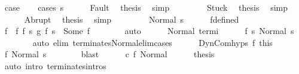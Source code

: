 \begin{isabellebody}
\ {\isacharquery}case\isanewline
\ \ \isamarkupfalse%
\ {\isacharparenleft}cases\ s{\isacharparenright}\isanewline
\ \ \ \ \isamarkupfalse%
\ Fault\ \isamarkupfalse%
\ {\isacharquery}thesis\ \isamarkupfalse%
\ simp\isanewline
\ \ \isamarkupfalse%
\isanewline
\ \ \ \ \isamarkupfalse%
\ Stuck\ \isamarkupfalse%
\ {\isacharquery}thesis\ \isamarkupfalse%
\ simp\isanewline
\ \ \isamarkupfalse%
\isanewline
\ \ \ \ \isamarkupfalse%
\ Abrupt\ \isamarkupfalse%
\ {\isacharquery}thesis\ \isamarkupfalse%
\ simp\isanewline
\ \ \isamarkupfalse%
\isanewline
\ \ \ \ \isamarkupfalse%
\ {\isacharparenleft}Normal\ s{\isacharprime}{\isacharparenright}\isanewline
\ \ \ \ \isamarkupfalse%
\ f{\isacharunderscore}defined\ \isamarkupfalse%
\ f\ \ f{\isacharcolon}\ {\isachardoublequoteopen}{\isacharparenleft}{\isacharparenleft}f{}\ s{\isacharprime}{\isacharparenright}\ {\isasyminter}\isactrlsub g\ {\isacharparenleft}f{}\ s{\isacharprime}{\isacharparenright}{\isacharparenright}\ {\isacharequal}\ Some\ f{\isachardoublequoteclose}\isanewline
\ \ \ \ \ \ \isamarkupfalse%
\ auto\isanewline
\ \ \ \ \isamarkupfalse%
\ Normal\ termi\isanewline
\ \ \ \ \isamarkupfalse%
\ {\isachardoublequoteopen}{\isasymGamma}{\isasymturnstile}f{}\ s{\isacharprime}{\isasymdown}\ {\isacharparenleft}Normal\ s{\isacharprime}{\isacharparenright}{\isachardoublequoteclose}\isanewline
\ \ \ \ \ \ \isamarkupfalse%
\ {\isacharparenleft}auto\ elim{\isacharcolon}\ terminates{\isacharunderscore}Normal{\isacharunderscore}elim{\isacharunderscore}cases{\isacharparenright}\isanewline
\ \ \ \ \isamarkupfalse%
\ DynCom{\isachardot}hyps\ f\ this\ \isanewline
\ \ \ \ \isamarkupfalse%
\ {\isachardoublequoteopen}{\isasymGamma}{\isasymturnstile}f{\isasymdown}\ {\isacharparenleft}Normal\ s{\isacharprime}{\isacharparenright}{\isachardoublequoteclose}\isanewline
\ \ \ \ \ \ \isamarkupfalse%
\ blast\isanewline
\ \ \ \ \isamarkupfalse%
\ c\ f\ Normal\isanewline
\ \ \ \ \isamarkupfalse%
\ {\isacharquery}thesis\isanewline
\ \ \ \ \ \ \isamarkupfalse%
\ {\isacharparenleft}auto\ intro{\isacharcolon}\ terminates{\isachardot}intros{\isacharparenright}\isanewline
\ \ \isamarkupfalse%

\end{isabellebody}
